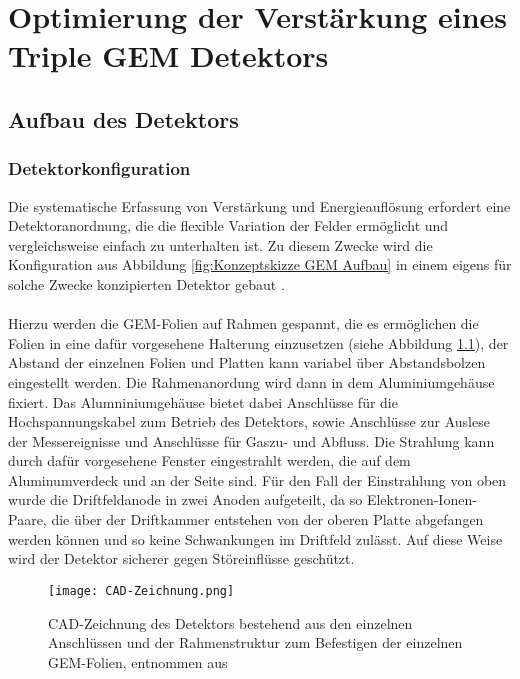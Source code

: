 \chapter{Optimierung der Verstärkung eines Triple GEM Detektors}

	\section{Aufbau des Detektors}
		\subsection{Detektorkonfiguration}
	Die systematische Erfassung von Verstärkung und Energieauflösung erfordert eine Detektoranordnung, die die flexible Variation der Felder ermöglicht und vergleichsweise einfach zu unterhalten ist. Zu diesem Zwecke wird die Konfiguration aus Abbildung \ref{fig:Konzeptskizze GEM Aufbau} in einem eigens für solche Zwecke konzipierten Detektor gebaut \cite{DetektorPrototyp}. \\
	\\
	 Hierzu werden die GEM-Folien auf Rahmen gespannt, die es ermöglichen die Folien in eine dafür vorgesehene Halterung einzusetzen (siehe Abbildung \ref{fig:CAD-Zeichnung}), der Abstand der einzelnen Folien und Platten kann variabel über Abstandsbolzen eingestellt werden. Die Rahmenanordung wird dann in dem Aluminiumgehäuse fixiert. Das Alumniniumgehäuse bietet dabei Anschlüsse für die Hochspannungskabel zum Betrieb des Detektors, sowie Anschlüsse zur Auslese der Messereignisse und Anschlüsse für Gaszu- und Abfluss. Die Strahlung kann durch dafür vorgesehene Fenster eingestrahlt werden, die auf dem Aluminumverdeck und an der Seite sind. Für den Fall der Einstrahlung von oben wurde die Driftfeldanode in zwei Anoden aufgeteilt, da so Elektronen-Ionen-Paare, die über der Driftkammer entstehen von der oberen Platte abgefangen werden können und so keine Schwankungen im Driftfeld zulässt. Auf diese Weise wird der Detektor sicherer gegen Störeinflüsse geschützt.
	 \begin{figure}[h]
	 	\centering
	 	\texttt{[image: CAD-Zeichnung.png]}
	 	\caption{CAD-Zeichnung des Detektors bestehend aus den einzelnen Anschlüssen und der Rahmenstruktur zum Befestigen der einzelnen GEM-Folien, entnommen aus \cite{ottnad}}
	 	\label{fig:CAD-Zeichnung}
	 \end{figure}

\newpage


